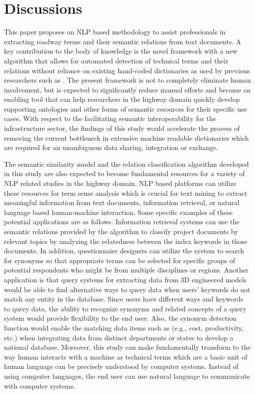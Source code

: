 \documentclass[Journal, BackFigs,NoLists, DoubleSpace]{ascelike}%
\begin{document}
\section{Discussions} \label{sec:dis}
%
This paper proposes an NLP based methodology to assist professionals in extracting roadway terms and their semantic relations from text documents. A key contribution to the body of knowledge is the novel framework with a new algorithm that allows for automated detection of technical terms and their relations without reliance on existing hand-coded dictionaries as used by previous researchers such as . The present framework is not to completely eliminate human involvement, but is expected to significantly reduce manual efforts and become an enabling tool that can help researchers in the highway domain quickly develop supporting ontologies and other forms of semantic resources for their specific use cases. With respect to the facilitating semantic interoperability for the infrastructure sector, the findings of this study would accelerate the process of removing the current bottleneck in extensive machine readable dictionaries which are required for an unambiguous data sharing, integration or exchange. 
%
\par
The semantic similarity model and the relation classification algorithm developed in this study are also expected to become fundamental resources for a variety of NLP related studies in the highway domain. NLP based platforms can utilize these resources for term sense analysis which is crucial for text mining to extract meaningful information from text documents, information retrieval, or natural language based human-machine interaction. Some specific examples of these potential applications are as follows. Information retrieval systems can use the semantic relations provided by the algorithm to classify project documents by relevant topics by analyzing the relatedness between the index keywords in those documents. In addition, questionnaire designers can utilize the system to search for synonyms so that appropriate terms can be selected for specific groups of potential respondents who might be from multiple disciplines or regions. Another application is that query systems for extracting data from 3D engineered models would be able to find alternative ways to query data when users' keywords do not match any entity in the database. Since users have different ways and keywords to query data, the ability to recognize synonyms and related concepts of a query system would provide flexibility to the end user. Also, the synonym detection function would enable the matching data items such as (e.g., cost, productivity, etc.) when integrating data from distinct departments or states to develop a national database. Moreover, this study can make fundamentally transform to the way human interacts with a machine as technical terms which are a basic unit of human language can be precisely understood by computer systems. Instead of using computer languages, the end user can use natural language to communicate with computer systems.
\end{document}
